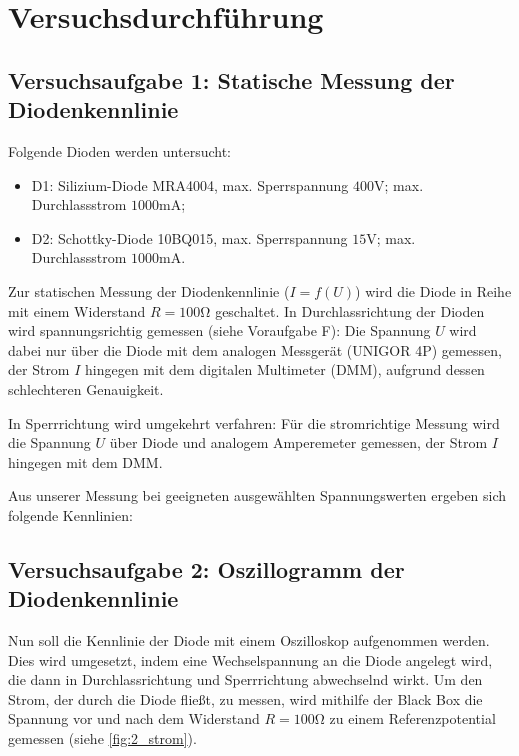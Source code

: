 \chapter{Versuchsdurchführung}

\section{Versuchsaufgabe 1: Statische Messung der Diodenkennlinie}

Folgende Dioden werden untersucht:

\begin{itemize}
    \item{D1:} Silizium-Diode MRA4004, max. Sperrspannung $400 \si{\volt}$; max. Durchlassstrom $1000 \si{\milli\ampere}$;
    \item{D2:} Schottky-Diode 10BQ015, max. Sperrspannung $15 \si{\volt}$; max. Durchlassstrom $1000 \si{\milli\ampere}$.
\end{itemize}

Zur statischen Messung der Diodenkennlinie ($I = f(U)$) wird die Diode in Reihe mit einem Widerstand $R = 100 \si{\ohm}$ geschaltet.
In Durchlassrichtung der Dioden wird spannungsrichtig gemessen (siehe Voraufgabe F):
Die Spannung $U$ wird dabei nur über die Diode mit dem analogen Messgerät (UNIGOR 4P) gemessen, 
der Strom $I$ hingegen mit dem digitalen Multimeter (DMM), aufgrund dessen schlechteren Genauigkeit.

In Sperrrichtung wird umgekehrt verfahren: Für die stromrichtige Messung wird die Spannung $U$ über Diode und analogem Amperemeter gemessen,
der Strom $I$ hingegen mit dem DMM.


Aus unserer Messung bei geeigneten ausgewählten Spannungswerten ergeben sich folgende Kennlinien:


\section{Versuchsaufgabe 2: Oszillogramm der Diodenkennlinie}
\label{sec:A2}

Nun soll die Kennlinie der Diode mit einem Oszilloskop aufgenommen werden.
Dies wird umgesetzt, indem eine Wechselspannung an die Diode angelegt wird, 
die dann in Durchlassrichtung und Sperrrichtung abwechselnd wirkt.
Um den Strom, der durch die Diode fließt, zu messen, wird mithilfe der Black Box die Spannung vor und nach dem Widerstand $R = 100 \si{\ohm}$
zu einem Referenzpotential gemessen (siehe \ref{fig:2_strom}).

